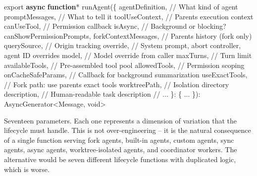 \documentclass[
  english,
  11pt,
  letterpaper,
]{book}
\newenvironment{Shaded}{\begin{snugshade}}{\end{snugshade}}
\newcommand{\CommentTok}[1]{\textcolor[rgb]{0.37,0.37,0.37}{#1}}
\newcommand{\DataTypeTok}[1]{\textcolor[rgb]{0.68,0.00,0.00}{#1}}
\newcommand{\FunctionTok}[1]{\textcolor[rgb]{0.28,0.35,0.67}{#1}}
\newcommand{\ImportTok}[1]{\textcolor[rgb]{0.00,0.46,0.62}{#1}}
\newcommand{\KeywordTok}[1]{\textcolor[rgb]{0.00,0.23,0.31}{\textbf{#1}}}
\newcommand{\NormalTok}[1]{\textcolor[rgb]{0.00,0.23,0.31}{#1}}
\newcommand{\OperatorTok}[1]{\textcolor[rgb]{0.37,0.37,0.37}{#1}}
\begin{document}
\begin{Shaded}
\begin{Highlighting}[]
\ImportTok{export} \KeywordTok{async} \KeywordTok{function}\OperatorTok{*} \FunctionTok{runAgent}\NormalTok{(\{}
\NormalTok{  agentDefinition}\OperatorTok{,}       \CommentTok{// What kind of agent}
\NormalTok{  promptMessages}\OperatorTok{,}        \CommentTok{// What to tell it}
\NormalTok{  toolUseContext}\OperatorTok{,}        \CommentTok{// Parent\textquotesingle{}s execution context}
\NormalTok{  canUseTool}\OperatorTok{,}           \CommentTok{// Permission callback}
\NormalTok{  isAsync}\OperatorTok{,}              \CommentTok{// Background or blocking?}
\NormalTok{  canShowPermissionPrompts}\OperatorTok{,}
\NormalTok{  forkContextMessages}\OperatorTok{,}  \CommentTok{// Parent\textquotesingle{}s history (fork only)}
\NormalTok{  querySource}\OperatorTok{,}          \CommentTok{// Origin tracking}
\NormalTok{  override}\OperatorTok{,}             \CommentTok{// System prompt, abort controller, agent ID overrides}
\NormalTok{  model}\OperatorTok{,}                \CommentTok{// Model override from caller}
\NormalTok{  maxTurns}\OperatorTok{,}             \CommentTok{// Turn limit}
\NormalTok{  availableTools}\OperatorTok{,}       \CommentTok{// Pre{-}assembled tool pool}
\NormalTok{  allowedTools}\OperatorTok{,}         \CommentTok{// Permission scoping}
\NormalTok{  onCacheSafeParams}\OperatorTok{,}    \CommentTok{// Callback for background summarization}
\NormalTok{  useExactTools}\OperatorTok{,}        \CommentTok{// Fork path: use parent\textquotesingle{}s exact tools}
\NormalTok{  worktreePath}\OperatorTok{,}         \CommentTok{// Isolation directory}
\NormalTok{  description}\OperatorTok{,}          \CommentTok{// Human{-}readable task description}
  \CommentTok{// ...}
\NormalTok{\}}\OperatorTok{:}\NormalTok{ \{ }\OperatorTok{...}\NormalTok{ \})}\OperatorTok{:}\NormalTok{ AsyncGenerator}\OperatorTok{\textless{}}\NormalTok{Message}\OperatorTok{,} \DataTypeTok{void}\OperatorTok{\textgreater{}}
\end{Highlighting}
\end{Shaded}

Seventeen parameters. Each one represents a dimension of variation that
the lifecycle must handle. This is not over-engineering -- it is the
natural consequence of a single function serving fork agents, built-in
agents, custom agents, sync agents, async agents, worktree-isolated
agents, and coordinator workers. The alternative would be seven
different lifecycle functions with duplicated logic, which is worse.
\end{document}
